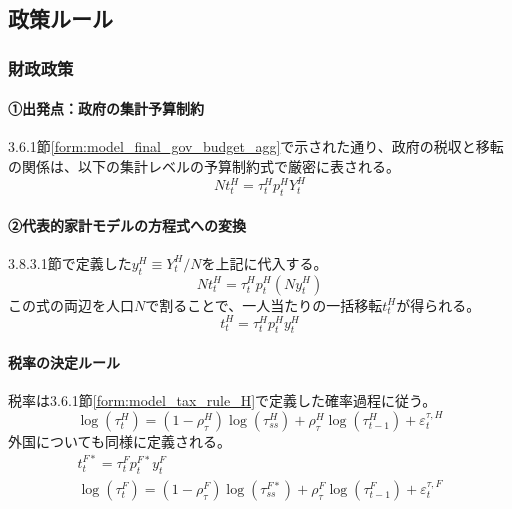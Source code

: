 \subsection{政策ルール}
\label{sec:chapter3_final_equations_policy}
\subsubsection{財政政策}
\label{sec:chapter3_final_equations_policy_fiscal}
\paragraph{①出発点：政府の集計予算制約}\label{sec:chapter3_final_equations_policy_fiscal_origin}
3.6.1節\eqref{form:model_final_gov_budget_agg}で示された通り、政府の税収と移転の関係は、以下の集計レベルの予算制約式で厳密に表される。
\begin{equation}
Nt_t^H=\tau_t^Hp_t^HY_t^H
\label{form:model_final_equations_gov_agg_restated}
\end{equation}

\paragraph{②代表的家計モデルの方程式への変換}\label{sec:chapter3_final_equations_policy_fiscal_ra_eq}
3.8.3.1節で定義した\(y_t^H\equiv Y_t^H/N\)を上記に代入する。
\begin{equation}
Nt_t^H=\tau_t^Hp_t^H(Ny_t^H)
\label{form:model_final_equations_gov_transfer_derivation}
\end{equation}
この式の両辺を人口\(N\)で割ることで、一人当たりの一括移転\(t_t^H\)が得られる。
\begin{equation}
t_t^H=\tau_t^Hp_t^Hy_t^H
\label{form:model_final_equations_gov_transfer_h}
\end{equation}

\paragraph{税率の決定ルール}\label{sec:chapter3_final_equations_policy_fiscal_tax_rule}
税率は3.6.1節\eqref{form:model_tax_rule_H}で定義した確率過程に従う。
\begin{equation}
\log(\tau_t^H)=(1-\rho_\tau^H)\log(\tau_{ss}^H)+\rho_\tau^H\log(\tau_{t-1}^H)+\varepsilon_t^{\tau,H}
\label{form:model_final_equations_gov_tax_rule_h_restated}
\end{equation}
外国についても同様に定義される。
\begin{align}
t_t^{F*}=\tau_t^Fp_t^{F*}y_t^F \label{form:model_final_equations_gov_transfer_f} \\
\log(\tau_t^F)=(1-\rho_\tau^F)\log(\tau_{ss}^{F*})+\rho_\tau^F\log(\tau_{t-1}^F)+\varepsilon_t^{\tau,F} \label{form:model_final_equations_gov_tax_rule_f_restated}
\end{align}

